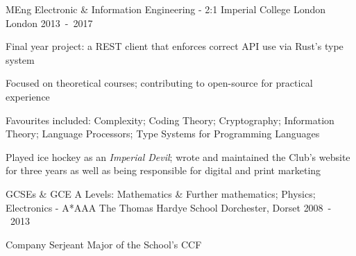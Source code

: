 \begin{cventries}

\cventry
  {MEng Electronic \& Information Engineering - 2:1}
  {Imperial College London}
  {London}
  {2013~-~2017}
  {\begin{cvitems}
    \item {Final year project: a REST client that enforces correct API use via Rust's type system}
    \item {Focused on theoretical courses; contributing to open-source for practical experience}
    \item {Favourites included: Complexity; Coding Theory; Cryptography; Information Theory; Language Processors; Type Systems for Programming Languages}
    \item {Played ice hockey as an \emph{Imperial Devil}; wrote and maintained the Club's website for three years as well as being responsible for digital and print marketing}
  \end{cvitems}}

\cventry
  {GCSEs \& GCE A Levels: Mathematics \& Further mathematics; Physics; Electronics - A*AAA}
  {The Thomas Hardye School}
  {Dorchester, Dorset}
  {2008~-~2013}
  {\begin{cvitems}
    \item {Company Serjeant Major of the School's CCF}
  \end{cvitems}}

\end{cventries}
